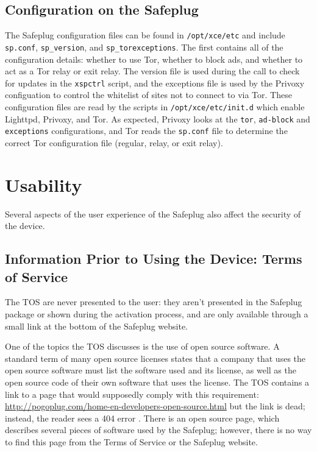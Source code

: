 \documentclass[letterpaper,twocolumn,10pt]{article}
\begin{document}
\subsection{Configuration on the Safeplug}
\label{spconfig}
The Safeplug configuration files can be found in \verb!/opt/xce/etc! and include \verb!sp.conf!, \verb!sp_version!, and \verb!sp_torexceptions!.  The first contains all of the configuration details: whether to use Tor, whether to block ads, and whether to act as a Tor relay or exit relay. The version file is used during the call to check for updates in the \verb!xspctrl! script, and the exceptions file is used by the Privoxy configuation to control the whitelist of sites not to connect to via Tor.  These configuration files are read by the scripts in \verb!/opt/xce/etc/init.d! which enable Lighttpd, Privoxy, and Tor.  As expected, Privoxy looks at the \verb!tor!, \verb!ad-block! and \verb!exceptions! configurations, and Tor reads the \verb!sp.conf! file to determine the correct Tor configuration file (regular, relay, or exit relay).

\section{Usability}
Several aspects of the user experience of the Safeplug also affect the security of the device.

\subsection{Information Prior to Using the Device: Terms of Service}
\label{tos}
The TOS are never presented to the user: they aren't presented in the Safeplug package or shown during the activation process, and are only available through a small link at the bottom of the Safeplug website\cite{safeplug}.  

One of the topics the TOS discusses is the use of open source software.  A standard term of many open source licenses states that a company that uses the open source software must list the software used and its license, as well as the open source code of their own software that uses the license.  The TOS contains a link to a page that would supposedly comply with this requirement: \url{http://pogoplug.com/home-en-developers-open-source.html} but the link is dead; instead, the reader sees a 404 error \cite{safeplug}.  There is an open source page, which describes several pieces of software used by the Safeplug; however, there is no way to find this page from the Terms of Service or the Safeplug website.
\end{document}
